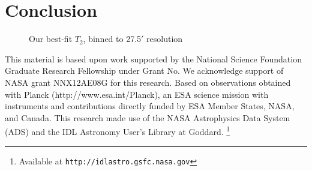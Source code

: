 \documentclass{emulateapj}
\begin{document}

\section{Conclusion}


\label{sec:conclusion}

\begin{figure*} [ht]
\begin{center}
\caption{Our best-fit $T_2$, binned to 27.5$'$ resolution}
\end{center}
\end{figure*}

This material is based upon work supported by the National Science Foundation 
Graduate Research Fellowship under Grant No. We acknowledge support of NASA 
grant NNX12AE08G for this research. Based on observations obtained with Planck 
(http://www.esa.int/Planck), an ESA science mission with instruments and 
contributions directly funded by ESA Member States, NASA, and Canada. This 
research made use of the NASA Astrophysics Data System (ADS) and the IDL 
Astronomy User's Library at Goddard. \footnote{Available at 
\texttt{http://idlastro.gsfc.nasa.gov}}



\end{document}
